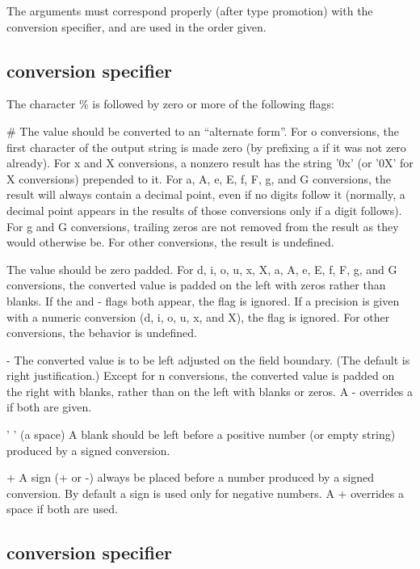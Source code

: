 The arguments must correspond properly (after type promotion) with the conversion specifier, and are used in the order given.\hypertarget{io_printf_The}{}\subsection{conversion specifier}\label{io_printf_The}
The character {\ttfamily \%} is followed by zero or more of the following flags\-: 
\begin{DoxyItemize}
\item {\ttfamily \#} The value should be converted to an ``alternate form''. For {\ttfamily o} conversions, the first character of the output string is made zero (by prefixing a {} if it was not zero already). For {\ttfamily x} and {\ttfamily X} conversions, a nonzero result has the string {\ttfamily '0x'} (or {\ttfamily '0\-X'} for {\ttfamily X} conversions) prepended to it. For {\ttfamily a, A, e, E, f, F, g,} and {\ttfamily G} conversions, the result will always contain a decimal point, even if no digits follow it (normally, a decimal point appears in the results of those conversions only if a digit follows). For {\ttfamily g} and {\ttfamily G} conversions, trailing zeros are not removed from the result as they would otherwise be. For other conversions, the result is undefined.  
\item {} The value should be zero padded. For {\ttfamily d, i, o, u, x, X, a, A, e, E, f, F, g,} and {\ttfamily G} conversions, the converted value is padded on the left with zeros rather than blanks. If the {} and {\ttfamily -\/} flags both appear, the {} flag is ignored. If a precision is given with a numeric conversion {\ttfamily (d, i, o, u, x, and X)}, the {} flag is ignored. For other conversions, the behavior is undefined.  
\item {\ttfamily -\/} The converted value is to be left adjusted on the field boundary. (The default is right justification.) Except for {\ttfamily n} conversions, the converted value is padded on the right with blanks, rather than on the left with blanks or zeros. A {\ttfamily -\/} overrides a {} if both are given.  
\item {\ttfamily ' '} (a space) A blank should be left before a positive number (or empty string) produced by a signed conversion.  
\item {\ttfamily +} A sign ({\ttfamily +} or {\ttfamily -\/}) always be placed before a number produced by a signed conversion. By default a sign is used only for negative numbers. A {\ttfamily +} overrides a space if both are used.  
\end{DoxyItemize}\hypertarget{io_printf_The}{}\subsection{conversion specifier}\label{io_printf_The}
